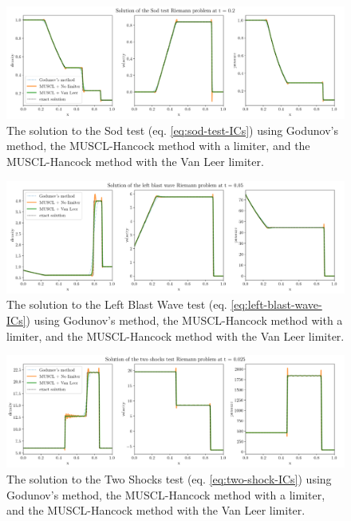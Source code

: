 \begin{figure}
   \centering
   \includegraphics[width=\linewidth]{figures/FV/MUSCL-Hancock/MUSCL-comparison-sod_test-1D.png}
   \caption[Sod test using MUSCL-Hancock method]{
The solution to the Sod test (eq. \ref{eq:sod-test-ICs}) using Godunov's method, the MUSCL-Hancock
method with a limiter, and the MUSCL-Hancock method with the Van Leer limiter.
}
    \label{fig:MUSCL-sod-test}
\end{figure}
%
\begin{figure}
   \centering
\includegraphics[width=\linewidth]{figures/FV/MUSCL-Hancock/MUSCL-comparison-left_blast_wave-1D.png}
   \caption[Left Blast Wave test using MUSCL-Hancock method]{
The solution to the Left Blast Wave test (eq. \ref{eq:left-blast-wave-ICs}) using Godunov's method,
the MUSCL-Hancock method with a limiter, and the MUSCL-Hancock method with the Van Leer limiter.
}
   \label{fig:MUSCL-left-blast-wave}
\end{figure}
%
\begin{figure}
   \centering
   \includegraphics[width=\linewidth]{figures/FV/MUSCL-Hancock/MUSCL-comparison-two_shocks-1D.png}
   \caption[Two Shocks test using MUSCL-Hancock method]{
The solution to the Two Shocks test (eq. \ref{eq:two-shock-ICs}) using Godunov's method, the
MUSCL-Hancock method with a limiter, and the MUSCL-Hancock method with the Van Leer limiter.
}
    \label{fig:MUSCL-two-shocks}
\end{figure}





